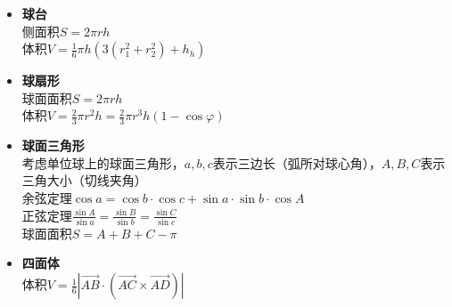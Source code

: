 \begin{itemize}
			\item \textbf{球台}
				\\侧面积$ S = 2 \pi r h $
				\\体积$ V = \frac{1}{6} \pi h (3(r_1^2 + r_2^2) + h_h) $
			\item \textbf{球扇形}
				\\球面面积$ S = 2 \pi r h $
				\\体积$ V = \frac{2}{3} \pi r^2 h = \frac{2}{3} \pi r^3 h (1 - \cos \varphi) $
			\item \textbf{球面三角形}
				\\考虑单位球上的球面三角形，$ a, b, c $表示三边长（弧所对球心角），$ A, B, C $表示三角大小（切线夹角）
				\\余弦定理$ \cos a = \cos b \cdot \cos c + \sin a \cdot \sin b \cdot \cos A $
				\\正弦定理$ \frac{\sin A}{\sin a} = \frac{\sin B}{\sin b} = \frac{\sin C}{\sin c} $
				\\球面面积$ S = A + B + C - \pi $
			\item \textbf{四面体}
				\\体积$ V = \frac{1}{6} \left| \overrightarrow{AB} \cdot (\overrightarrow{AC} \times \overrightarrow{AD}) \right| $
		\end{itemize}